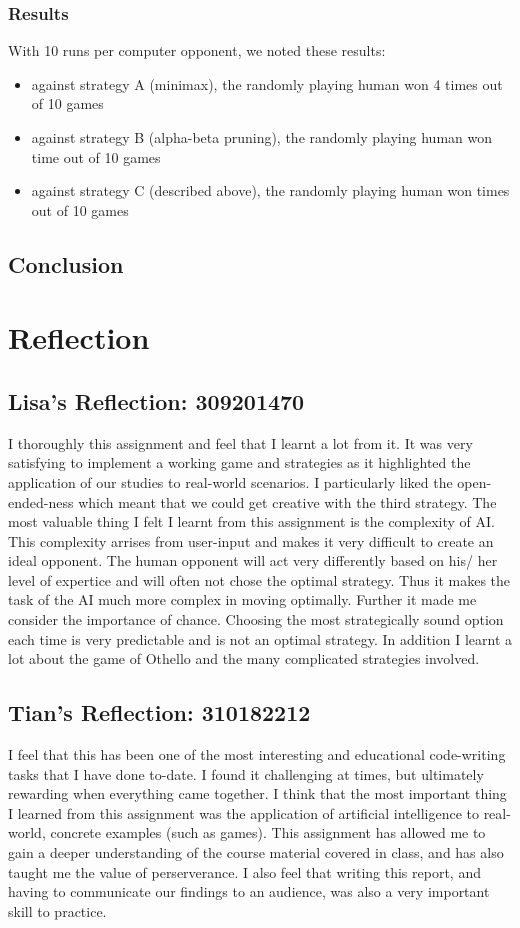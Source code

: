 \documentclass[12pt]{article}
\begin{document}
\subsubsection{Results}
With 10 runs per computer opponent, we noted these results:
\begin{itemize}
 \item against strategy A (minimax), the randomly playing human won 4 times out of 10 games
 \item against strategy B (alpha-beta pruning), the randomly playing human won time out of 10 games
 \item against strategy C (described above), the randomly playing human won times out of 10 games
\end{itemize}

\subsection{Conclusion}

\section{Reflection}

\subsection{Lisa's Reflection: 309201470}
I thoroughly this assignment and feel that I learnt a lot from it. It was very satisfying to implement a working game and strategies as it highlighted the application of our studies to real-world scenarios. I particularly liked the open-ended-ness which meant that we could get creative with the third strategy. The most valuable thing I felt I learnt from this assignment is the complexity of AI. This complexity arrises from user-input and makes it very difficult to create an ideal opponent. The human opponent will act very differently based on his/ her level of expertice and will often not chose the optimal strategy. Thus it makes the task of the AI much more complex in moving optimally. Further it made me consider the importance of chance. Choosing the most strategically sound option each time is very predictable and is not an optimal strategy. In addition I learnt a lot about the game of Othello and the many complicated strategies involved.

\subsection{Tian's Reflection: 310182212}
I feel that this has been one of the most interesting and educational code-writing tasks that I have done to-date.
I found it challenging at times, but ultimately rewarding when everything came together. I think that the most
important thing I learned from this assignment was the application of artificial intelligence to real-world, concrete
examples (such as games). This assignment has allowed me to gain a deeper understanding of the course material
covered in class, and has also taught me the value of perserverance. I also feel that writing this report, and
having to communicate our findings to an audience, was also a very important skill to practice.
\end{document}
